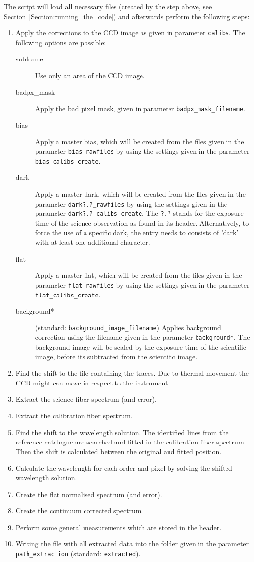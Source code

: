 \documentclass[10pt,a4paper]{article}
\begin{document}
The script will load all necessary files (created by the step above, see Section~\ref{Section:running_the_code}) and afterwards perform the following steps:
\begin{enumerate}
  \item Apply the corrections to the CCD image as given in parameter \verb|calibs|. The following options are possible:
  \begin{description}
    \item[subframe] Use only an area of the CCD image.
    \item[badpx\_mask] Apply the bad pixel mask, given in parameter \verb|badpx_mask_filename|.
    \item[bias] Apply a master bias, which will be created from the files given in the parameter \verb|bias_rawfiles| by using the settings given in the parameter \verb|bias_calibs_create|.
    \item[dark] Apply a master dark, which will be created from the files given in the parameter \verb|dark?.?_rawfiles| by using the settings given in the parameter \verb|dark?.?_calibs_create|. The \verb|?.?| stands for the exposure time of the science observation as found in its header. Alternatively, to force the use of a specific dark, the entry needs to consists of 'dark' with at least one additional character.
    \item[flat] Apply a master flat, which will be created from the files given in the parameter \verb|flat_rawfiles| by using the settings given in the parameter \verb|flat_calibs_create|.
    \item[background*] (standard: \verb|background_image_filename|) Applies background correction using the filename given in the parameter \verb|background*|. The background image will be scaled by the exposure time of the scientific image, before its subtracted from the scientific image.
  \end{description}
  \item Find the shift to the file containing the traces. Due to thermal movement the CCD might can move in respect to the instrument.
  \item Extract the science fiber spectrum (and error).
  \item Extract the calibration fiber spectrum.
  \item Find the shift to the wavelength solution. The identified lines from the reference catalogue are searched and fitted in the calibration fiber spectrum. Then the shift is calculated between the original and fitted position.
  \item Calculate the wavelength for each order and pixel by solving the shifted wavelength solution.
  \item Create the flat normalised spectrum (and error).
  \item Create the continuum corrected spectrum.
  \item Perform some general measurements which are stored in the header.
  \item Writing the file with all extracted data into the folder given in the parameter \verb|path_extraction| (standard: \verb|extracted|).
\end{enumerate}
\end{document}
